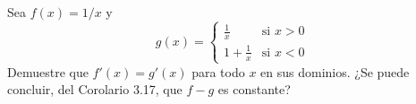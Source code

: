 \item Sea $f(x) = 1/x$ y
    $$g(x) = \begin{cases} 
    \frac{1}{x} & \text{si } x > 0 \\ 
    1 + \frac{1}{x} & \text{si } x < 0 
    \end{cases}$$
    Demuestre que $f'(x) = g'(x)$ para todo $x$ en sus dominios. ¿Se puede concluir, del Corolario 3.17, que $f - g$ es constante?
